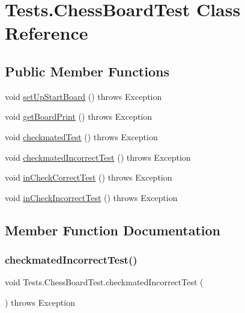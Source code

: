 \hypertarget{class_tests_1_1_chess_board_test}{}\section{Tests.\+Chess\+Board\+Test Class Reference}
\label{class_tests_1_1_chess_board_test}
\subsection*{Public Member Functions}
\begin{DoxyCompactItemize}
\item 
void \hyperlink{class_tests_1_1_chess_board_test_a7a18a9e735b522810010395d66c8dfb6}{set\+Up\+Start\+Board} ()  throws Exception 
\item 
void \hyperlink{class_tests_1_1_chess_board_test_a5c359522c675af1dbd6140bf9a9ae781}{get\+Board\+Print} ()  throws Exception 
\item 
void \hyperlink{class_tests_1_1_chess_board_test_a8083a428a23ac5846f1be101d54e5895}{checkmated\+Test} ()  throws Exception 
\item 
void \hyperlink{class_tests_1_1_chess_board_test_aa70f54755cd78be34645b8b61eaa3525}{checkmated\+Incorrect\+Test} ()  throws Exception 
\item 
void \hyperlink{class_tests_1_1_chess_board_test_ae52616e4ffccca2eca925939695dc77b}{in\+Check\+Correct\+Test} ()  throws Exception 
\item 
void \hyperlink{class_tests_1_1_chess_board_test_aa253138d0dce44a1e1fb1cf42ef925d1}{in\+Check\+Incorrect\+Test} ()  throws Exception 
\end{DoxyCompactItemize}


\subsection{Member Function Documentation}
\mbox{\label{class_tests_1_1_chess_board_test_aa70f54755cd78be34645b8b61eaa3525}} 
\subsubsection{\texorpdfstring{checkmated\+Incorrect\+Test()}{checkmatedIncorrectTest()}}
{\footnotesize\ttfamily void Tests.\+Chess\+Board\+Test.\+checkmated\+Incorrect\+Test (\begin{DoxyParamCaption}{ }\end{DoxyParamCaption}) throws Exception\hspace{0.3cm}{\ttfamily [inline]}}

